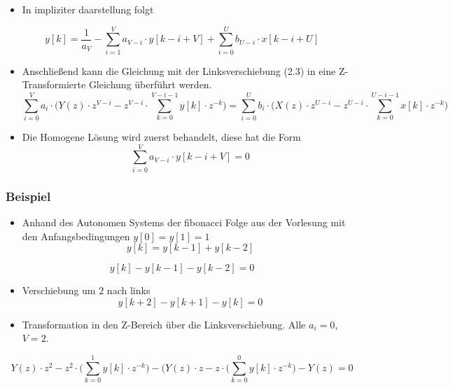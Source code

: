 \documentclass[11pt]{article}
\providecommand{\tightlist}{%
      \setlength{\itemsep}{0pt}\setlength{\parskip}{0pt}}
\begin{document}
    \begin{itemize}
\tightlist
\item
  In impliziter daarstellung folgt
\end{itemize}

    \[ y[k] = \frac{1}{a_V} - \sum_{i = 1}^V a_{V-i} \cdot y[k-i+V] + \sum_{i = 0}^U b_{U-i} \cdot x[k-i+U] \]

    \begin{itemize}
\tightlist
\item
  Anschließend kann die Gleichung mit der Linksverschiebung (2.3) in
  eine Z-Transformierte Gleichung überführt werden.
  \[\sum_{i=0}^V a_i \cdot \big(Y(z) \cdot z^{V-i} - z^{V-i} \cdot \sum_{k = 0}^{V-i-1} y[k] \cdot z^{-k}\big) = \sum_{i=0}^U b_i \cdot \big(X(z) \cdot z^{U-i} - z^{U-i} \cdot \sum_{k = 0}^{U-i-1} x[k] \cdot z^{-k}\big)\]
\end{itemize}

    \begin{itemize}
\tightlist
\item
  Die Homogene Lösung wird zuerst behandelt, diese hat die Form \[
  \sum_{i = 0}^V a_{V-i} \cdot y[k-i+V] = 0
  \]
\end{itemize}

    \subsubsection{Beispiel}\label{beispiel}

\begin{itemize}
\tightlist
\item
  Anhand des Autonomen Systems der fibonacci Folge aus der Vorlesung mit
  den Anfangsbedingungen \(y[0] = y[1] = 1\) \[y[k] = y[k-1] + y[k-2] \]
\end{itemize}

    \[ y[k] - y[k-1] - y[k-2] = 0\]

    \begin{itemize}
\tightlist
\item
  Verschiebung um \(2\) nach links \[ y[k+2] - y[k+1] - y[k] = 0\]
\end{itemize}

    \begin{itemize}
\tightlist
\item
  Transformation in den Z-Bereich über die Linksverschiebung. Alle
  \(a_i = 0\), \(V = 2\).
\end{itemize}

    \[Y(z) \cdot z^2 - z^2 \cdot \big(\sum_{k=0}^{1} y[k] \cdot z^{-k}\big)- (Y(z) \cdot z - z \cdot \big(\sum_{k=0}^{0} y[k] \cdot z^{-k}\big)- Y(z)= 0\]
\end{document}
